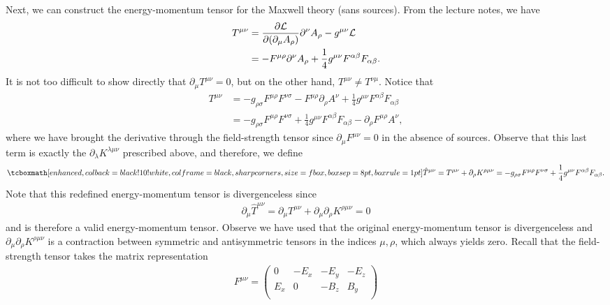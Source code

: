 {Next, we can construct the energy-momentum tensor for the Maxwell theory (sans sources).
From the lecture notes, we have
\begin{align}
    T^{\mu\nu} &= \pdv{\mathcal{L}}{(\partial_{\mu} A_{\rho})} \partial^{\nu} A_{\rho} - g^{\mu\nu} \mathcal{L} \nonumber \\
               &= -F^{\mu\rho} \partial^{\nu} A_{\rho} + \frac{1}{4} g^{\mu\nu} F^{\alpha\beta} F_{\alpha\beta}
.\end{align}
It is not too difficult to show directly that $\partial_{\mu} T^{\mu\nu} = 0$, but on the other hand, $T^{\mu\nu} \ne T^{\nu\mu}$.
Notice that
\begin{align}
    T^{\mu\nu} &= - g_{\rho \sigma} F^{\mu\rho} F^{\nu\sigma} - F^{\mu\rho} \partial_{\rho} A^{\nu} + \frac{1}{4} g^{\mu\nu} F^{\alpha\beta} F_{\alpha \beta} \nonumber \\
               &= -g_{\rho\sigma} F^{\mu\rho} F^{\nu\sigma} + \frac{1}{4} g^{\mu\nu} F^{\alpha\beta} F_{\alpha\beta} - \partial_{\rho} F^{\mu\rho} A^{\nu}
,\end{align}
where we have brought the derivative through the field-strength tensor since $\partial_{\mu} F^{\mu\nu} = 0$ in the absence of sources.
Observe that this last term is exactly the $\partial_{\lambda} K^{\lambda \mu\nu}$ prescribed above, and therefore, we define
\begin{align}
    \eqbox{ \hat{T}^{\mu\nu} = T^{\mu\nu} + \partial_{\rho} K^{\rho \mu\nu} = -g_{\rho\sigma} F^{\mu\rho} F^{\nu\sigma} + \frac{1}{4} g^{\mu\nu} F^{\alpha \beta} F_{\alpha\beta} }
.\end{align}
Note that this redefined energy-momentum tensor is divergenceless since
\begin{align}
    \partial_{\mu} \hat{T}^{\mu\nu} = \partial_{\mu} T^{\mu\nu} + \partial_{\mu} \partial_{\rho} K^{\rho\mu\nu} = 0
\end{align}
and is therefore a valid energy-momentum tensor.
Observe we have used that the original energy-momentum tensor is divergenceless and $\partial_{\mu} \partial_{\rho} K^{\rho\mu\nu}$ is a contraction between symmetric and antisymmetric tensors in the indices $\mu,\rho$, which always yields zero.
Recall that the field-strength tensor takes the matrix representation
\begin{align}
    F^{\mu\nu} = 
    \begin{pmatrix}
        0 & -E_{x} & -E_{y} & -E_{z} \\
        E_{x} & 0 & -B_{z} & B_{y} \\

\end{pmatrix}
\end{align}}

